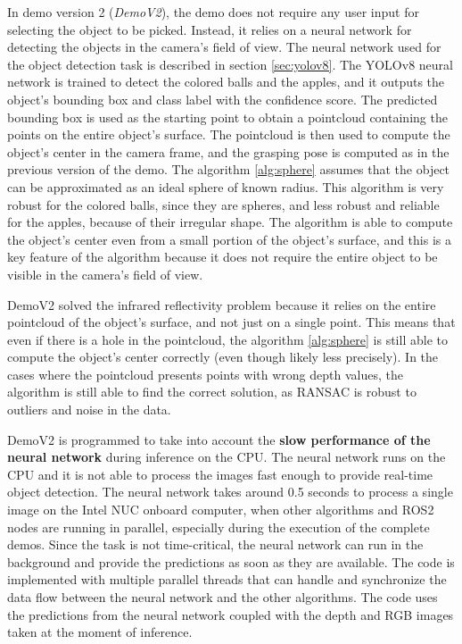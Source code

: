 In demo version 2 (\textit{DemoV2}), the demo does not require any user input for selecting the object to be picked.
Instead, it relies on a neural network for detecting the objects in the camera's field of view. 
The neural network used for the object detection task is described in section \ref{sec:yolov8}.
The YOLOv8 neural network
is trained to detect the colored balls and the apples, and it outputs the object's bounding box and class label
with the confidence score. The predicted bounding box is used as the starting point to obtain a pointcloud
containing the points on the entire object's surface. The pointcloud is then used to compute the object's center
in the camera frame, and the grasping pose is computed as in the previous version of the demo.
The algorithm \ref{alg:sphere} assumes that the object can be approximated as an ideal sphere of known radius.
This algorithm is very robust for the colored balls, since they are spheres, and less robust and reliable
for the apples, because of their irregular shape. The algorithm is able to compute the object's center
even from a small portion of the object's surface, and this is a key feature of the algorithm because
it does not require the entire object to be visible in the camera's field of view.

DemoV2 solved the infrared reflectivity problem because it relies on the entire pointcloud of the object's surface, and not just
on a single point. This means that even if there is a hole in the pointcloud, the algorithm \ref{alg:sphere} is still able
to compute the object's center correctly (even though likely less precisely).
In the cases where the pointcloud presents points with wrong depth values, the algorithm
is still able to find the correct solution, as RANSAC is robust to outliers and noise in the data.

DemoV2 is programmed to take into account the \textbf{slow performance of the neural network} during inference
on the CPU. The neural network runs on the CPU and it is not able to process the images fast enough to provide
real-time object detection. The neural network takes around 0.5 seconds to process a single image
on the Intel NUC onboard computer, when other algorithms and ROS2 nodes are running in parallel,
especially during the execution of the complete demos. 
Since the task is not time-critical, the neural network can run in the background and provide the predictions
as soon as they are available. The code is implemented with multiple parallel threads that can handle 
and synchronize the data flow between the neural network and the other algorithms.
The code uses the predictions from the neural network coupled with the depth and RGB
images taken at the moment of inference.


